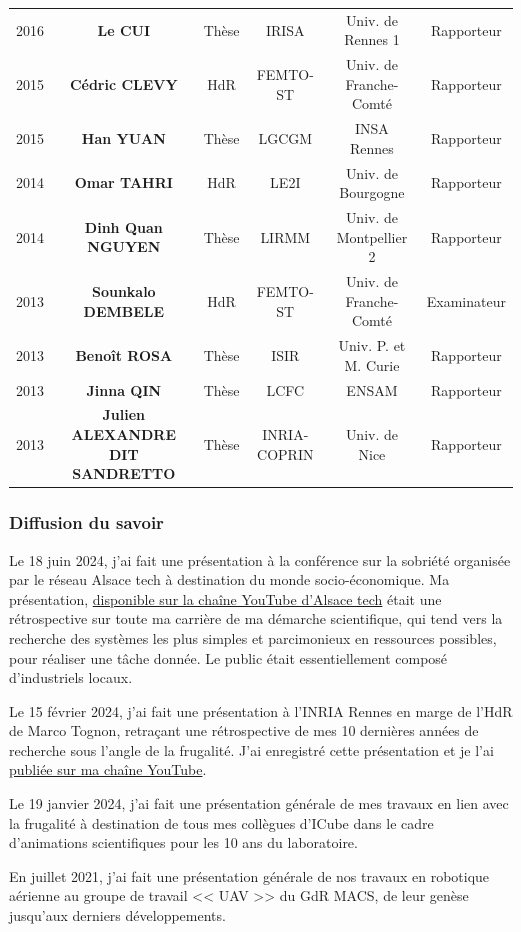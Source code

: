 \documentclass[a4paper,12pt]{article}
\begin{document}
{\begin{tabular}{cccccc}
2016 & \bf{Le CUI}  & Thèse & IRISA & Univ. de Rennes 1 & Rapporteur \\
2015 & \bf{Cédric CLEVY}  & HdR & FEMTO-ST & Univ. de Franche-Comté & Rapporteur \\
2015 & \bf{Han YUAN}  & Thèse & LGCGM & INSA Rennes & Rapporteur \\
2014 & \bf{Omar TAHRI} & HdR & LE2I & Univ. de Bourgogne & Rapporteur \\
2014 & \bf{Dinh Quan NGUYEN}  & Thèse & LIRMM & Univ. de Montpellier 2 & Rapporteur \\
2013 & \bf{Sounkalo DEMBELE}  & HdR & FEMTO-ST & Univ. de Franche-Comté & Examinateur \\
2013 & \bf{Benoît ROSA}  & Thèse & ISIR & Univ. P. et M. Curie & Rapporteur \\
2013 & \bf{Jinna QIN}  & Thèse & LCFC & ENSAM & Rapporteur \\
2013 & \bf{Julien ALEXANDRE DIT SANDRETTO}  & Thèse & INRIA-COPRIN & Univ. de Nice & Rapporteur \\ \bottomrule
\end{tabular}
}

\subsubsection{Diffusion du savoir}

Le 18 juin 2024, j'ai fait une présentation à la conférence sur la sobriété organisée par le réseau Alsace tech à destination du monde socio-économique. Ma présentation, \href{https://youtu.be/kJXx7LR21H4?t=2701}{disponible sur la chaîne YouTube d'Alsace tech} était une rétrospective sur toute ma carrière de ma démarche scientifique, qui tend vers la recherche des systèmes les plus simples et parcimonieux en ressources possibles, pour réaliser une tâche donnée. Le public était essentiellement composé d'industriels locaux.

Le 15 février 2024, j'ai fait une présentation à l'INRIA Rennes en marge de l'HdR de Marco Tognon, retraçant une rétrospective de mes 10 dernières années de recherche sous l'angle de la frugalité. J'ai enregistré cette présentation et je l'ai \href{https://youtu.be/ThW7nigN9hQ}{publiée sur ma chaîne YouTube}.

Le 19 janvier 2024, j'ai fait une présentation générale de mes travaux en lien avec la frugalité à destination de tous mes collègues d'ICube dans le cadre d'animations scientifiques pour les 10 ans du laboratoire.

En juillet 2021, j'ai fait une présentation générale de nos travaux en robotique aérienne au groupe de travail << UAV >> du GdR MACS, de leur genèse jusqu'aux derniers développements.
\end{document}
